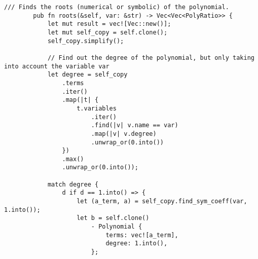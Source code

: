     \begin{lstlisting}[caption={The implementation of the \texttt{roots()} method for the \texttt{Polynomial} struct}, label={lst:polynomial-roots}]
        /// Finds the roots (numerical or symbolic) of the polynomial.
        pub fn roots(&self, var: &str) -> Vec<Vec<PolyRatio>> {
            let mut result = vec![Vec::new()];
            let mut self_copy = self.clone();
            self_copy.simplify();

            // Find out the degree of the polynomial, but only taking into account the variable var
            let degree = self_copy
                .terms
                .iter()
                .map(|t| {
                    t.variables
                        .iter()
                        .find(|v| v.name == var)
                        .map(|v| v.degree)
                        .unwrap_or(0.into())
                })
                .max()
                .unwrap_or(0.into());

            match degree {
                d if d == 1.into() => {
                    let (a_term, a) = self_copy.find_sym_coeff(var, 1.into());
                    let b = self.clone()
                        - Polynomial {
                            terms: vec![a_term],
                            degree: 1.into(),
                        };


\end{lstlisting}
